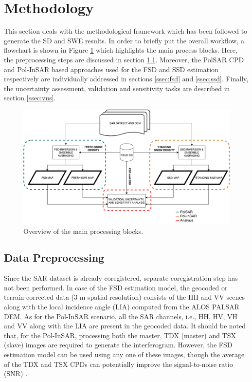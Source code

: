 \documentclass[review]{elsarticle}
\numberwithin{equation}{section}
\numberwithin{figure}{section}
\numberwithin{table}{section}
\begin{document}
\section{Methodology}
\label{sec:method}

This section deals with the methodological framework which has been followed to generate the SD and SWE results. In order to briefly put the overall workflow, a flowchart is shown in Figure \ref{fig:method_overview} which highlights the main process blocks. Here, the preprocessing steps are discussed in section \ref{ssec:pre}. Moreover, the PolSAR CPD and Pol-InSAR based approaches used for the FSD and SSD estimation respectively are individually addressed in sections \ref{ssec:fsd} and \ref{ssec:ssd}. Finally, the uncertainty assessment, validation and sensitivity tasks are described in section \ref{ssec:vus}.

\begin{figure}[htb]
    \centering
    \includegraphics[width=\textwidth]{Figures/Methods/Overview_Method.png}
    \caption{Overview of the main processing blocks.}
    \label{fig:method_overview}
\end{figure}

\subsection{Data Preprocessing}
\label{ssec:pre}

Since the SAR dataset is already coregistered, separate coregistration step has not been performed. In case of the FSD estimation model, the geocoded or terrain-corrected data (3 m spatial resolution) consists of the HH and VV scenes along with the local incidence angle (LIA) computed from the ALOS PALSAR DEM. As for the Pol-InSAR scenario, all the SAR channels, i.e., HH, HV, VH and VV along with the LIA are present in the geocoded data. It should be noted that, for the Pol-InSAR, processing both the master, TDX (master) and TSX (slave) images are required to generate the interferogram. However, the FSD estimation model can be used using any one of these images, though the average of the TDX and TSX CPDs can potentially improve the signal-to-noise ratio (SNR) \citep{Leinss2014}.
\end{document}
